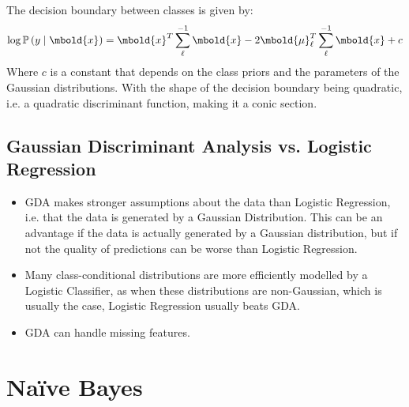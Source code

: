 \documentclass[12pt letter]{report}
\begin{document}
The decision boundary between classes is given by:
\[
  \log \mathbb{P} \left( y  \mid \mbold{x} \right) = \mbold{x}^T \displaystyle\sum_{\ell}^{-1} \mbold{x} - 2
  \mbold{\mu }_{\ell}^T \displaystyle\sum_{\ell}^{-1} \mbold{x} + c
\]
Where $c$ is a constant that depends on the class priors and the parameters of the Gaussian distributions. With the
shape of the decision boundary being quadratic, i.e. a quadratic discriminant function, making it a conic section.

\section{Gaussian Discriminant Analysis vs. Logistic Regression}

\begin{itemize}
  \item GDA makes stronger assumptions about the data than Logistic Regression, i.e. that the data is generated by a
        Gaussian Distribution. This can be an advantage if the data is actually generated by a Gaussian distribution, but if
        not the quality of predictions can be worse than Logistic Regression.
  \item Many class-conditional distributions are more efficiently modelled by a Logistic Classifier, as when these
        distributions are non-Gaussian, which is usually the case, Logistic Regression usually beats GDA.
  \item GDA can handle missing features.
\end{itemize}

\chapter{Naïve Bayes}

\end{document}
